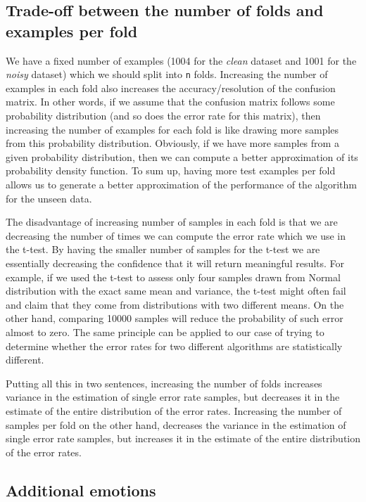 \documentclass[a4paper]{article}
\begin{document}
\subsection{Trade-off between the number of folds and examples per fold}

We have a fixed number of examples (1004 for the \emph{clean} dataset and 1001 for the \emph{noisy} dataset) which we should split into \texttt{n} folds. Increasing the number of examples in each fold also increases the accuracy/resolution of the confusion matrix. In other words, if we assume that the confusion matrix follows some probability distribution (and so does the error rate for this matrix), then increasing the number of examples for each fold is like drawing more samples from this probability distribution. Obviously, if we have more samples from a given probability distribution, then we can compute a better approximation of its probability density function. To sum up, having more test examples per fold allows us to generate a better approximation of the performance of the algorithm for the unseen data. \medskip

The disadvantage of increasing number of samples in each fold is that we are decreasing the number of times we can compute the error rate which we use in the t-test. By having the smaller number of samples for the t-test we are essentially decreasing the confidence that it will return meaningful results. For example, if we used the t-test to assess only four samples drawn from Normal distribution with the exact same mean and variance, the t-test might often fail and claim that they come from distributions with two different means. On the other hand, comparing 10000 samples will reduce the probability of such error almost to zero. The same principle can be applied to our case of trying to determine whether the error rates for two different algorithms are statistically different. \medskip

Putting all this in two sentences, increasing the number of folds increases variance in the estimation of single error rate samples, but decreases it in the estimate of the entire distribution of the error rates. Increasing the number of samples per fold on the other hand, decreases the variance in the estimation of single error rate samples, but increases it in the estimate of the entire distribution of the error rates.

\subsection{Additional emotions}
\end{document}
